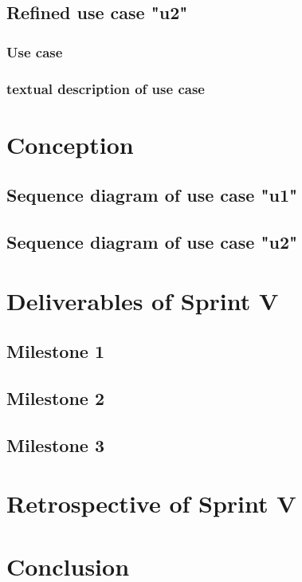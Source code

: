 \subsection{Refined use case "u2"}
\subsubsection{Use case}
\subsubsection{textual description of use case}

\section{Conception}
\subsection{Sequence diagram of use case "u1"}
\subsection{Sequence diagram of use case "u2"}

\section{Deliverables of Sprint V}
\subsection{Milestone 1}
\subsection{Milestone 2}
\subsection{Milestone 3}
\section{Retrospective of Sprint V}
\section{Conclusion}
